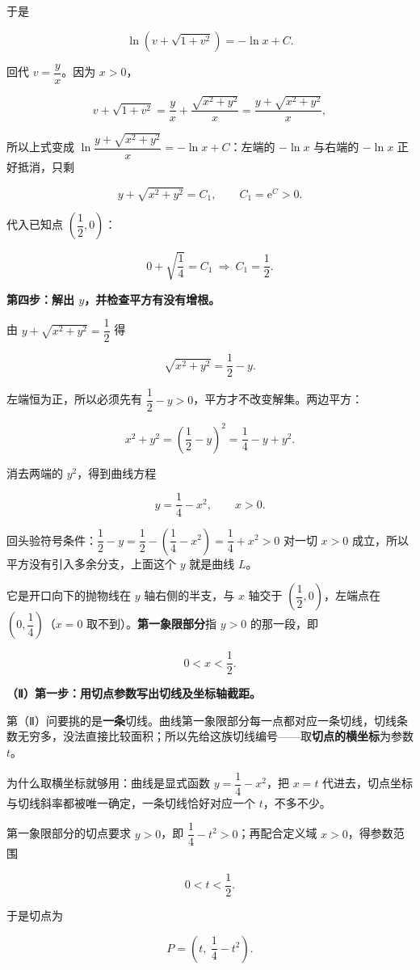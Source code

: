 \documentclass[UTF8,11pt,fontset=windows]{ctexart}
\begin{document}
于是

$$
\ln\left(v+\sqrt{1+v^2}\right)=-\ln x+C.
$$

回代 $v=\dfrac yx$。因为 $x>0$，

$$
v+\sqrt{1+v^2}=\frac yx+\frac{\sqrt{x^2+y^2}}{x}=\frac{y+\sqrt{x^2+y^2}}{x},
$$

所以上式变成 $\ln\dfrac{y+\sqrt{x^2+y^2}}{x}=-\ln x+C$：左端的 $-\ln x$ 与右端的 $-\ln x$ 正好抵消，只剩

$$
y+\sqrt{x^2+y^2}=C_1,\qquad C_1=\mathrm e^{C}>0.
$$

代入已知点 $\left(\dfrac12,0\right)$：

$$
0+\sqrt{\frac14}=C_1\ \Longrightarrow\ C_1=\frac12.
$$

\textbf{第四步：解出 $y$，并检查平方有没有增根。}

由 $y+\sqrt{x^2+y^2}=\dfrac12$ 得

$$
\sqrt{x^2+y^2}=\frac12-y.
$$

左端恒为正，所以必须先有 $\dfrac12-y>0$，平方才不改变解集。两边平方：

$$
x^2+y^2=\left(\frac12-y\right)^2=\frac14-y+y^2.
$$

消去两端的 $y^2$，得到曲线方程

$$
y=\frac14-x^2,\qquad x>0.
$$

回头验符号条件：$\dfrac12-y=\dfrac12-\left(\dfrac14-x^2\right)=\dfrac14+x^2>0$ 对一切 $x>0$ 成立，所以平方没有引入多余分支，上面这个 $y$ 就是曲线 $L$。

它是开口向下的抛物线在 $y$ 轴右侧的半支，与 $x$ 轴交于 $\left(\dfrac12,0\right)$，左端点在 $\left(0,\dfrac14\right)$（$x=0$ 取不到）。\textbf{第一象限部分}指 $y>0$ 的那一段，即

$$
0<x<\frac12.
$$

\textbf{（Ⅱ）第一步：用切点参数写出切线及坐标轴截距。}

第（Ⅱ）问要挑的是\textbf{一条}切线。曲线第一象限部分每一点都对应一条切线，切线条数无穷多，没法直接比较面积；所以先给这族切线编号——取\textbf{切点的横坐标}为参数 $t$。

为什么取横坐标就够用：曲线是显式函数 $y=\dfrac14-x^2$，把 $x=t$ 代进去，切点坐标与切线斜率都被唯一确定，一条切线恰好对应一个 $t$，不多不少。

第一象限部分的切点要求 $y>0$，即 $\dfrac14-t^2>0$；再配合定义域 $x>0$，得参数范围

$$
0<t<\frac12.
$$

于是切点为

$$
P=\left(t,\ \frac14-t^2\right).
$$
\end{document}
